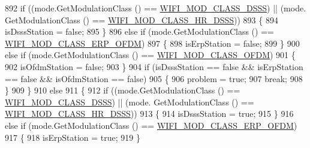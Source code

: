\begin{DoxyCode}
892                       \textcolor{keywordflow}{if} ((mode.GetModulationClass () == \hyperlink{namespacens3_aa999e1221606a2b21b1eb33c2007c217aed8070e1ee089724d73fe63030cc112c}{WIFI\_MOD\_CLASS\_DSSS}) || (mode.
      GetModulationClass () == \hyperlink{namespacens3_aa999e1221606a2b21b1eb33c2007c217a3c847bbae970f2de31e7b4eb7ff49840}{WIFI\_MOD\_CLASS\_HR\_DSSS}))
893                         \{
894                           isDsssStation = \textcolor{keyword}{false};
895                         \}
896                       \textcolor{keywordflow}{else} \textcolor{keywordflow}{if} (mode.GetModulationClass () == 
      \hyperlink{namespacens3_aa999e1221606a2b21b1eb33c2007c217afc1f5ef8d2c985f37a3224dd86ab014d}{WIFI\_MOD\_CLASS\_ERP\_OFDM})
897                         \{
898                           isErpStation = \textcolor{keyword}{false};
899                         \}
900                       \textcolor{keywordflow}{else} \textcolor{keywordflow}{if} (mode.GetModulationClass () == \hyperlink{namespacens3_aa999e1221606a2b21b1eb33c2007c217a30a83a0318357c9611f09e6faadc8006}{WIFI\_MOD\_CLASS\_OFDM})
901                         \{
902                           isOfdmStation = \textcolor{keyword}{false};
903                         \}
904                       \textcolor{keywordflow}{if} (isDsssStation == \textcolor{keyword}{false} && isErpStation == \textcolor{keyword}{false} && isOfdmStation == \textcolor{keyword}{false})
905                         \{
906                           problem = \textcolor{keyword}{true};
907                           \textcolor{keywordflow}{break};
908                         \}
909                     \}
910                   \textcolor{keywordflow}{else}
911                     \{
912                       \textcolor{keywordflow}{if} ((mode.GetModulationClass () == \hyperlink{namespacens3_aa999e1221606a2b21b1eb33c2007c217aed8070e1ee089724d73fe63030cc112c}{WIFI\_MOD\_CLASS\_DSSS}) || (mode.
      GetModulationClass () == \hyperlink{namespacens3_aa999e1221606a2b21b1eb33c2007c217a3c847bbae970f2de31e7b4eb7ff49840}{WIFI\_MOD\_CLASS\_HR\_DSSS}))
913                         \{
914                           isDsssStation = \textcolor{keyword}{true};
915                         \}
916                       \textcolor{keywordflow}{else} \textcolor{keywordflow}{if} (mode.GetModulationClass () == 
      \hyperlink{namespacens3_aa999e1221606a2b21b1eb33c2007c217afc1f5ef8d2c985f37a3224dd86ab014d}{WIFI\_MOD\_CLASS\_ERP\_OFDM})
917                         \{
918                           isErpStation = \textcolor{keyword}{true};
919                         \}

\end{DoxyCode}
